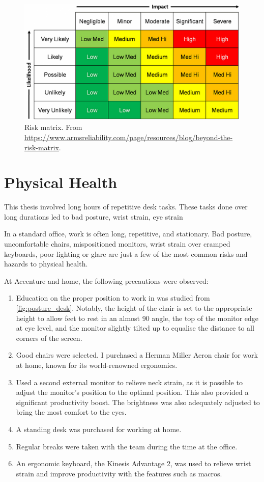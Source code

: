 \begin{figure}[H]
  \centering
  \includegraphics[width=\textwidth]{risk_matrix.png}
  \caption[Risk matrix.]{Risk matrix. From \url{https://www.armsreliability.com/page/resources/blog/beyond-the-risk-matrix}.}
  \label{fig:risk_matrix}
\end{figure}




\section{Physical Health}
This thesis involved long hours of repetitive desk tasks. These tasks done over long durations led to bad posture, wrist strain, eye strain



In a standard office, work is often long, repetitive, and stationary. Bad posture, uncomfortable chairs, mispositioned monitors, wrist strain over cramped keyboards, poor lighting or glare are just a few of the most common risks and hazards to physical health. 

At Accenture and home, the following precautions were observed:
\begin{enumerate}
  \item Education on the proper position to work in was studied from \ref{fig:posture_desk}. Notably, the height of the chair is set to the appropriate height to allow feet to rest in an almost \SI{90}{\deg} angle, the top of the monitor edge at eye level, and the monitor slightly tilted up to equalise the distance to all corners of the screen. 
  \item Good chairs were selected. I purchased a Herman Miller Aeron chair for work at home, known for its world-renowned ergonomics. 
  \item Used a second external monitor to relieve neck strain, as it is possible to adjust the monitor's position to the optimal position. This also provided a significant productivity boost. The brightness was also adequately adjusted to bring the most comfort to the eyes. 
  \item A standing desk was purchased for working at home. 
  \item Regular breaks were taken with the team during the time at the office. 
  \item An ergonomic keyboard, the Kinesis Advantage 2, was used to relieve wrist strain and improve productivity with the features such as macros. 
\end{enumerate}


